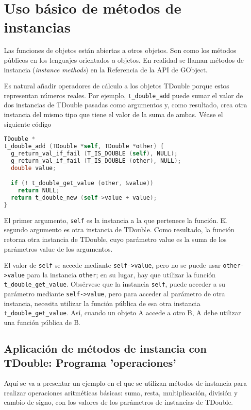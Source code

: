 \section{Uso básico de métodos de instancias}
Las funciones de objetos están abiertas a otros objetos. Son como los métodos públicos en los lenguajes
orientados a objetos.
En realidad se llaman métodos de instancia (\emph{instance methods}) en la Referencia de la API de GObject.

Es natural añadir operadores de cálculo a los objetos \textsf{TDouble} porque estos representan números
reales. Por ejemplo, \texttt{t\_double\_add} puede sumar el valor de dos instancias de \textsf{TDouble}
pasadas como argumentos y, como resultado, crea otra instancia del mismo tipo que tiene el valor de la
suma de ambas. Véase  el siguiente código
\begin{lstlisting}[language=C, numbers=none]
TDouble *
t_double_add (TDouble *self, TDouble *other) {
  g_return_val_if_fail (T_IS_DOUBLE (self), NULL);
  g_return_val_if_fail (T_IS_DOUBLE (other), NULL);
  double value;

  if (! t_double_get_value (other, &value))
    return NULL;
  return t_double_new (self->value + value);
}
\end{lstlisting}
El primer argumento, \texttt{self} es la instancia a la que pertenece la función. El segundo argumento es otra
instancia de \textsf{TDouble}. Como resultado, la función retorna otra instancia de \textsf{TDouble}, cuyo
parámetro \textsf{value} es la suma de los parámetros \textsf{value} de los argumentos.

El valor de \texttt{self} se accede mediante \texttt{self->value}, pero no se puede usar \texttt{other->value}
para la instancia \texttt{other}; en su lugar, hay que utilizar la función \texttt{t\_double\_get\_value}.
Obsérvese que la instancia \texttt{self}, puede acceder a su parámetro mediante \texttt{self->value},
pero para acceder al parámetro de otra instancia, necesita utilizar la función pública de esa otra
instancia \texttt{t\_double\_get\_value}. Así, cuando un objeto A accede a otro B, A debe utilizar una
función pública de B.

\subsection{Aplicación de métodos de instancia con \textsf{TDouble}: Programa 'operaciones'}
Aquí se va a presentar un ejemplo en el que se utilizan métodos de instancia para realizar operaciones
aritméticas básicas: suma, resta, multiplicación, división y cambio de signo, con los valores de los
parámetros de instancias de \textsf{TDouble}.

